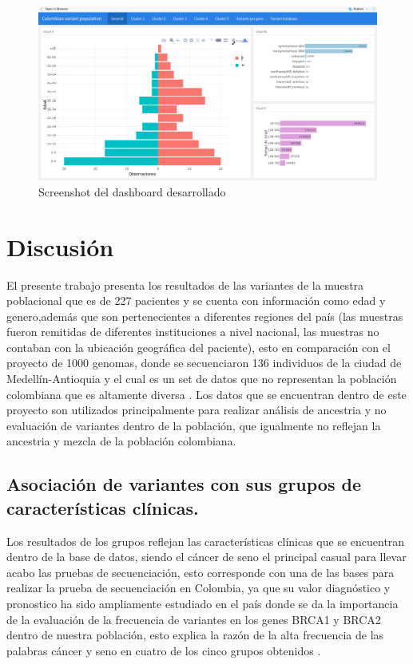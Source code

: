 \begin{figure}[H]
	\centering
	\includegraphics[width=1\textwidth]{Kap4/dash}
	\caption{Screenshot del dashboard desarrollado} \label{fig:dash}
\end{figure}

\section{Discusión}

El presente trabajo presenta los resultados de las variantes de la muestra poblacional que es de 227 pacientes y se cuenta con información como edad y genero,además que son pertenecientes a diferentes regiones del país (las muestras fueron remitidas de diferentes instituciones a nivel nacional, las muestras no contaban con la ubicación geográfica del paciente), esto en comparación con el proyecto de 1000 genomas, donde se secuenciaron 136 individuos de la ciudad de Medellín-Antioquia y el cual es un set de datos que no representan la población colombiana que es altamente diversa \cite{GabrielBedoya,Consortium2012}. Los datos que se encuentran dentro de este proyecto son utilizados principalmente para realizar análisis de ancestria \cite{Rishishwar2015a} y no evaluación de variantes dentro de la población, que igualmente no reflejan la ancestria y mezcla de la población colombiana. 

\subsection{Asociación de variantes con sus grupos de características clínicas.}

Los resultados de los grupos reflejan las características clínicas que se encuentran dentro de la base de datos, siendo el cáncer de seno el principal casual para llevar acabo las pruebas de secuenciación, esto corresponde con una de las bases para realizar la prueba de secuenciación en Colombia, ya que su valor diagnóstico y pronostico ha sido ampliamente estudiado en el país donde se da la importancia de la evaluación de la frecuencia de variantes en los genes BRCA1 y BRCA2 dentro de nuestra población, esto explica la razón de la alta frecuencia de las palabras cáncer y seno en cuatro de los cinco grupos obtenidos \cite{Ignacio2017,Arias-blanco2015}.\\

